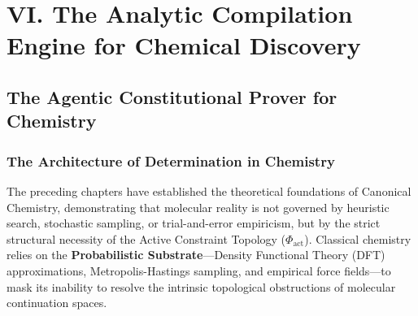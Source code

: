 \documentclass[11pt,openany]{extbook}
\theoremstyle{plain}
\theoremstyle{definition}
\begin{document}
\part{VI. The Analytic Compilation Engine for Chemical Discovery}

\chapter{The Agentic Constitutional Prover for Chemistry}

\section{The Architecture of Determination in Chemistry}

The preceding chapters have established the theoretical foundations of Canonical Chemistry, demonstrating that molecular reality is not governed by heuristic search, stochastic sampling, or trial-and-error empiricism, but by the strict structural necessity of the Active Constraint Topology ($\Phi_{\text{act}}$). Classical chemistry relies on the \textbf{Probabilistic Substrate}---Density Functional Theory (DFT) approximations, Metropolis-Hastings sampling, and empirical force fields---to mask its inability to resolve the intrinsic topological obstructions of molecular continuation spaces.
\end{document}
